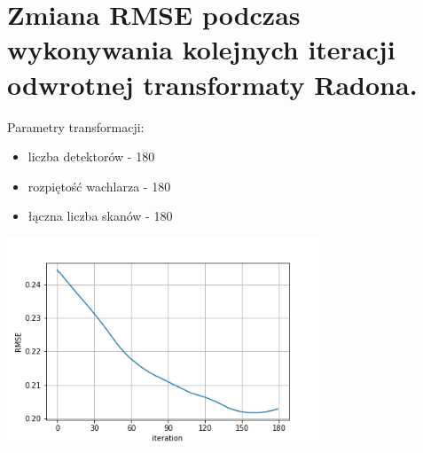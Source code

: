 \documentclass[a4paper, 11pt]{article}
\begin{document}
	\section{Zmiana RMSE podczas wykonywania kolejnych iteracji odwrotnej transformaty Radona.}
	
	
	Parametry transformacji:
	\begin{itemize}
		\item liczba detektorów - 180
		\item rozpiętość wachlarza - 180\degree
		\item łączna liczba skanów - 180
	\end{itemize}
	\begin{center}
		\includegraphics[width=0.7\textwidth]{change.png}
	\end{center}
\end{document}
